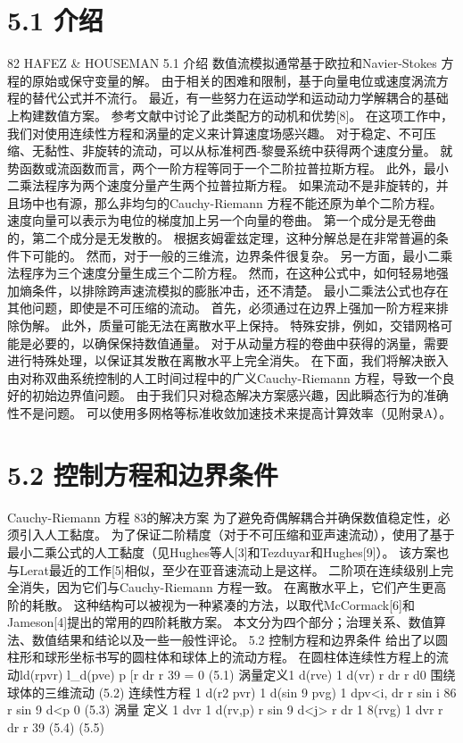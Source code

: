 \documentclass[UTF8,11pt,a4paper,openany,fontset=fandol]{ctexbook}
\begin{document}
\section{5.1 介绍}
82 HAFEZ \& HOUSEMAN 5.1 介绍 数值流模拟通常基于欧拉和Navier-Stokes 方程的原始或保守变量的解。 由于相关的困难和限制，基于向量电位或速度涡流方程的替代公式并不流行。 最近，有一些努力在运动学和运动动力学解耦合的基础上构建数值方案。 参考文献中讨论了此类配方的动机和优势[8]。 在这项工作中，我们对使用连续性方程和涡量的定义来计算速度场感兴趣。 对于稳定、不可压缩、无黏性、非旋转的流动，可以从标准柯西-黎曼系统中获得两个速度分量。 就势函数或流函数而言，两个一阶方程等同于一个二阶拉普拉斯方程。 此外，最小二乘法程序为两个速度分量产生两个拉普拉斯方程。 如果流动不是非旋转的，并且场中也有源，那么非均匀的Cauchy-Riemann 方程不能还原为单个二阶方程。 速度向量可以表示为电位的梯度加上另一个向量的卷曲。 第一个成分是无卷曲的，第二个成分是无发散的。 根据亥姆霍兹定理，这种分解总是在非常普遍的条件下可能的。 然而，对于一般的三维流，边界条件很复杂。 另一方面，最小二乘法程序为三个速度分量生成三个二阶方程。 然而，在这种公式中，如何轻易地强加熵条件，以排除跨声速流模拟的膨胀冲击，还不清楚。 最小二乘法公式也存在其他问题，即使是不可压缩的流动。 首先，必须通过在边界上强加一阶方程来排除伪解。 此外，质量可能无法在离散水平上保持。 特殊安排，例如，交错网格可能是必要的，以确保保持数值通量。 对于从动量方程的卷曲中获得的涡量，需要进行特殊处理，以保证其发散在离散水平上完全消失。 在下面，我们将解决嵌入由对称双曲系统控制的人工时间过程中的广义Cauchy-Riemann 方程，导致一个良好的初始边界值问题。 由于我们只对稳态解决方案感兴趣，因此瞬态行为的准确性不是问题。 可以使用多网格等标准收敛加速技术来提高计算效率（见附录A）。

\section{5.2 控制方程和边界条件}
Cauchy-Riemann 方程 83的解决方案 为了避免奇偶解耦合并确保数值稳定性，必须引入人工黏度。 为了保证二阶精度（对于不可压缩和亚声速流动），使用了基于最小二乘公式的人工黏度（见Hughes等人[3]和Tezduyar和Hughes[9]）。 该方案也与Lerat最近的工作[5]相似，至少在亚音速流动上是这样。 二阶项在连续级别上完全消失，因为它们与Cauchy-Riemann 方程一致。 在离散水平上，它们产生更高阶的耗散。 这种结构可以被视为一种紧凑的方法，以取代McCormack[6]和Jameson[4]提出的常用的四阶耗散方案。 本文分为四个部分；治理关系、数值算法、数值结果和结论以及一些一般性评论。 5.2 控制方程和边界条件 给出了以圆柱形和球形坐标书写的圆柱体和球体上的流动方程。 在圆柱体连续性方程上的流动ld(rpvr) l\_d(pve) p [r dr r 39 = 0 (5.1) 涡量定义1 d(rve) 1 d(vr) r dr r d0 围绕球体的三维流动 (5.2) 连续性方程 1 d(r2 pvr) 1 d(sin 9 pvg) 1 dpv<i, dr r sin i 86 r sin 9 d<p 0 (5.3) 涡量 定义 1 dvr 1 d(rv,p) r sin 9 d<j> r dr 1 8(rvg) 1 dvr r dr r 39 (5.4) (5.5)
\end{document}
